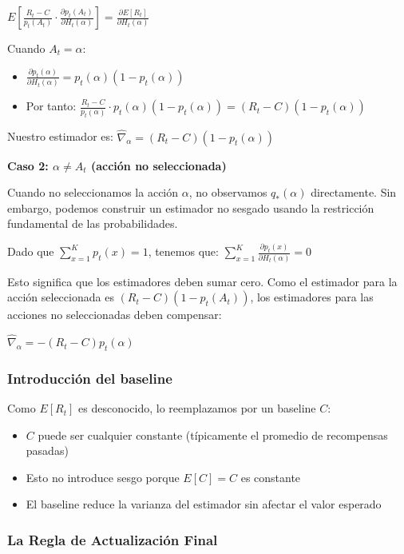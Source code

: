 \documentclass[12pt,a4paper]{article}
\begin{document}
$E\left[\frac{R_t - C}{p_t(A_t)} \cdot \frac{\partial p_t(A_t)}{\partial H_t(\alpha)}\right] = \frac{\partial E[R_t]}{\partial H_t(\alpha)}$

Cuando $A_t = \alpha$:
\begin{itemize}
\item $\frac{\partial p_t(\alpha)}{\partial H_t(\alpha)} = p_t(\alpha)(1 - p_t(\alpha))$
\item Por tanto: $\frac{R_t - C}{p_t(\alpha)} \cdot p_t(\alpha)(1 - p_t(\alpha)) = (R_t - C)(1 - p_t(\alpha))$
\end{itemize}

Nuestro estimador es:
$\widehat{\nabla}_\alpha = (R_t - C)(1 - p_t(\alpha))$

\textbf{Caso 2: $\alpha \neq A_t$ (acción no seleccionada)}

Cuando no seleccionamos la acción $\alpha$, no observamos $q_*(\alpha)$ directamente. Sin embargo, podemos construir un estimador no sesgado usando la restricción fundamental de las probabilidades.

Dado que $\sum_{x=1}^K p_t(x) = 1$, tenemos que:
$\sum_{x=1}^K \frac{\partial p_t(x)}{\partial H_t(\alpha)} = 0$

Esto significa que los estimadores deben sumar cero. Como el estimador para la acción seleccionada es $(R_t - C)(1 - p_t(A_t))$, los estimadores para las acciones no seleccionadas deben compensar:

$\widehat{\nabla}_\alpha = -(R_t - C)p_t(\alpha)$

\subsubsection{Introducción del baseline}

Como $E[R_t]$ es desconocido, lo reemplazamos por un baseline $C$:
\begin{itemize}
    \item $C$ puede ser cualquier constante (típicamente el promedio de recompensas pasadas)
    \item Esto no introduce sesgo porque $E[C] = C$ es constante
    \item El baseline reduce la varianza del estimador sin afectar el valor esperado
\end{itemize}

\subsubsection{La Regla de Actualización Final}
\end{document}
